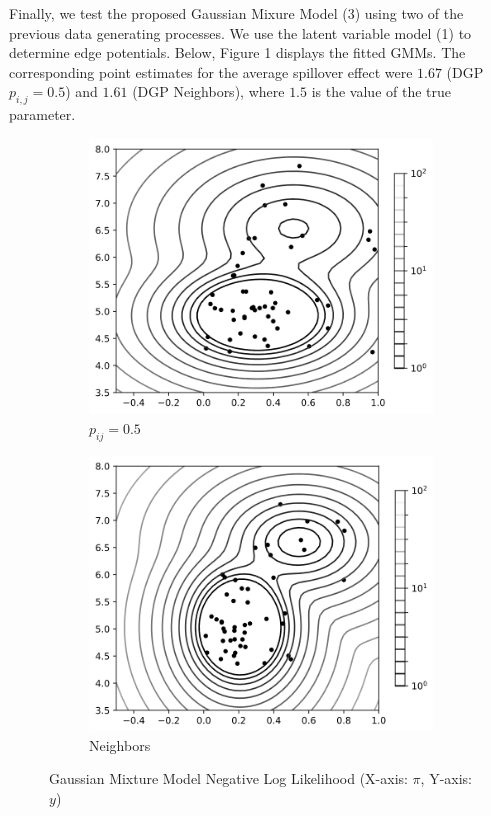 \documentclass{article}
\begin{document}
Finally, we test the proposed Gaussian Mixure Model (3) using two of the previous data generating processes. We 
use the latent variable model (1) to determine edge potentials. Below, Figure 1 displays the fitted GMMs. The 
corresponding point estimates for the average spillover effect were $1.67$ (DGP $p_{i,j} = 0.5$) and $1.61$ (DGP Neighbors), where $1.5$ is the value of the true parameter. 

\begin{figure}[htbp]
  \centering
  \begin{subfigure}[b]{0.45\textwidth}
      \centering
      \includegraphics[width=\textwidth]{gmmpij.png}
      \caption{$p_{ij} = 0.5$}
      \label{fig:fig1}
      \vspace{0.25cm}
  \end{subfigure}
  \hfill
  \begin{subfigure}[b]{0.45\textwidth}
      \centering
      \includegraphics[width=\textwidth]{gmmnbrs.png}
      \caption{Neighbors}
      \label{fig:fig2}
      \vspace{0.25cm}
  \end{subfigure}
  \caption{Gaussian Mixture Model Negative Log Likelihood (X-axis: $\pi$, Y-axis: $y$)}
  \label{fig:side_by_side}
\end{figure}
\end{document}
